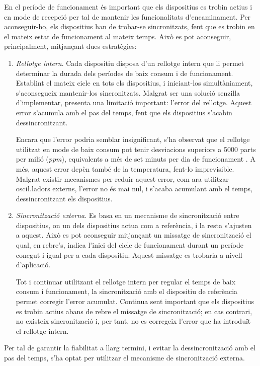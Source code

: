 \documentclass{tfgitic}[2024/07/01]
\begin{document}
{En el període de funcionament és important que els dispositius es trobin actius i en mode de recepció per tal de mantenir les funcionalitats d'encaminament. Per aconseguir-ho, els dispositius han de trobar-se sincronitzats, fent que es trobin en el mateix estat de funcionament al mateix temps. Això es pot aconseguir, principalment, mitjançant dues estratègies:
\begin{enumerate}
    \item \emph{Rellotge intern}. Cada dispositiu disposa d'un rellotge intern que li permet determinar la durada dels períodes de baix consum i de funcionament. Establint el mateix cicle en tots els dispositius, i iniciant-los simultàniament, s'aconsegueix mantenir-los sincronitzats. Malgrat ser una solució senzilla d'implementar, presenta una limitació important: l'error del rellotge. Aquest error s'acumula amb el pas del temps, fent que els dispositius s'acabin dessincronitzant.
    
    Encara que l'error podria semblar insignificant, s'ha observat que el rellotge utilitzat en mode de baix consum pot tenir desviacions superiors a 5000 parts per milió (\emph{ppm}), equivalents a més de set minuts per dia de funcionament \cite{nikki_smith_esp32_2022}. A més, aquest error depèn també de la temperatura, fent-lo imprevisible. Malgrat existir mecanismes per reduir aquest error, com ara utilitzar osci\l.ladors externs, l'error no és mai nul, i s'acaba acumulant amb el temps, dessincronitzant els dispositius.
    
    \item \emph{Sincronització externa}. Es basa en un mecanisme de sincronització entre dispositius, on un dels dispositius actua com a referència, i la resta s'ajusten a aquest. Això es pot aconseguir mitjançant un missatge de sincronització el qual, en rebre's, indica l'inici del cicle de funcionament durant un període conegut i igual per a cada dispositiu. Aquest missatge es trobaria a nivell d'aplicació. 
    
    Tot i continuar utilitzant el rellotge intern per regular el temps de baix consum i funcionament, la sincronització amb el dispositiu de referència permet corregir l'error acumulat. 
    Continua sent important que els dispositius es trobin actius abans de rebre el missatge de sincronització; en cas contrari, no existeix sincronització i, per tant, no es corregeix l'error que ha introduït el rellotge intern.
\end{enumerate}

Per tal de garantir la fiabilitat a llarg termini, i evitar la dessincronització amb el pas del temps, s'ha optat per utilitzar el mecanisme de sincronització externa. 

}
\end{document}
